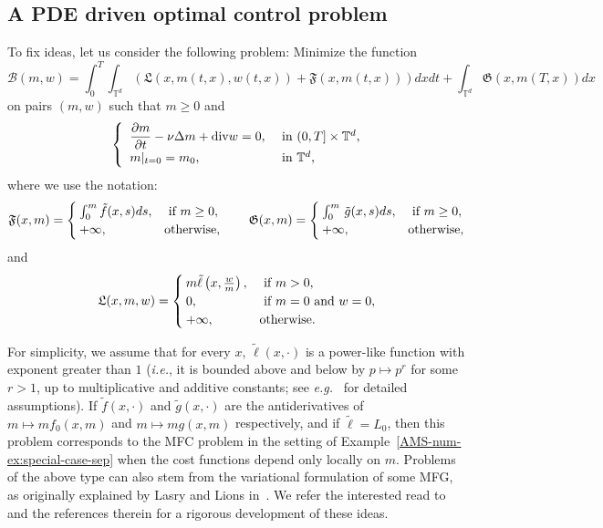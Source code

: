 \documentclass{amsproc}
\theoremstyle{definition}
\theoremstyle{remark}
\numberwithin{equation}{section}
\newcommand{\TT}{{\mathbb T}}
\newcommand{\cB}{{\mathcal B}}
\newcommand{\diver}{\mathrm{div}}
\begin{document}
\subsection{A PDE driven optimal control problem}

\label{AMS-num-subsec:PDE-optc}


To fix ideas, let us consider the following problem: Minimize the function
\begin{equation}
\label{AMS-num-eq:variational-primal-B}
	\cB(m,w) = \int_0^T \int_{\TT^d} \left(   \mathfrak{L}(x, m(t,x), w(t,x)) +   \mathfrak{F}(x, m(t,x)) \right) dx dt + \int_{\TT^d}   \mathfrak{G}(x, m(T,x)) dx
\end{equation}
on pairs $(m,w)$
such that $m\ge 0$ and 
\begin{equation}
\label{AMS-num-eq:variational-form-linearcons}
\begin{cases}
	\displaystyle
	\,\, \frac{\partial m}{\partial t}  - \nu \Delta m + \diver w = 0, 
	&\hbox{ in } (0,T] \times \TT^d ,
	\\
	\,\, m|_{t=0} = m_0,  &\hbox{ in }  \TT^d ,
\end{cases}
\end{equation}
where we use the notation:
$$
	  \mathfrak{F}(x,m) = 
	\begin{cases}
		\int_0^{m} \tilde f(x, s) ds, & \hbox{ if } m \ge 0,
		\\
		+\infty, 	& \hbox{otherwise,}
	\end{cases}
	\qquad
	  \mathfrak{G}(x,m) = 
	\begin{cases}
		\int_0^m \, \tilde g(x, s) ds, & \hbox{ if } m \ge 0,
		\\
		+\infty, 	& \hbox{otherwise,}
	\end{cases}
$$ 
and
$$
	 \mathfrak{L}(x, m, w) = 
	\begin{cases}
		m \tilde \ell \left(x, \frac{w}{m}\right), & \hbox{ if } m > 0,
		\\
		0, 		& \hbox{ if } m = 0 \hbox{ and } w = 0,
		\\
		+\infty, 	& \hbox{otherwise}.
	\end{cases}
$$

For simplicity, we assume that for every $x$, $\tilde \ell(x,\cdot)$ is a power-like function with exponent greater than $1$ (\textit{i.e.}, it is bounded above and below by $p \mapsto p^{r}$ for some $r>1$, up to multiplicative and additive constants; see \textit{e.g.}~\cite{MR3358627} for detailed assumptions). If $\tilde f(x, \cdot)$ and $\tilde g(x, \cdot)$ are the antiderivatives of $m \mapsto  m f_0(x, m)$ and $m \mapsto  m g(x, m)$ respectively, and if $\tilde \ell  = L_0$, then this problem corresponds to the MFC problem in the setting of Example~\ref{AMS-num-ex:special-case-sep} when the cost functions depend only locally on $m$. Problems of the above type can also stem from the variational formulation of some MFG, as originally explained by Lasry and Lions in~\cite{MR2295621}. We refer the interested read to~\cite{MR3399179,MR3358627,MR3498932} and the references therein for a rigorous development of these ideas.
\end{document}
